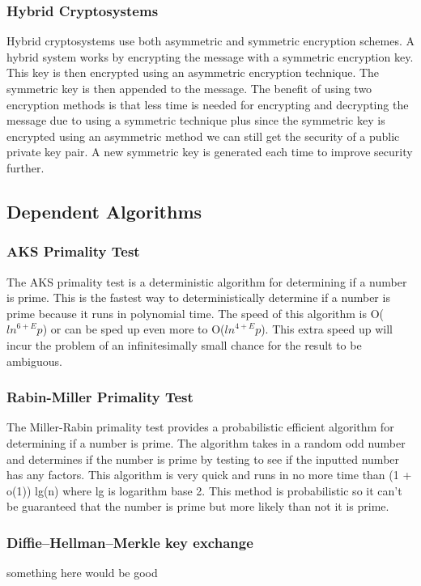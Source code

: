 \documentclass[conference]{IEEEtran}
\begin{document}
\subsubsection{Hybrid Cryptosystems}
Hybrid cryptosystems use both asymmetric and symmetric encryption schemes. A hybrid system works by encrypting the message with a symmetric encryption key. This key is then encrypted using an asymmetric encryption technique. The symmetric key is then appended to the message. The benefit of using two encryption methods is that less time is needed for encrypting and decrypting the message due to using a symmetric technique plus since the symmetric key is encrypted using an asymmetric method we can still get the security of a public private key pair. A new symmetric key is generated each time to improve security further. 


\subsection{Dependent Algorithms}

\subsubsection{AKS Primality Test}
The AKS primality test is a deterministic algorithm for determining if a number is prime. This is the fastest way to deterministically determine if a number is prime because it runs in polynomial time. The speed of this algorithm is O(${ln}^{6 + E} p$) or can be sped up even more to O(${ln}^{4 + E} p$). This extra speed up will incur the problem of an infinitesimally small chance for the result to be ambiguous.

\subsubsection{Rabin-Miller Primality Test}
The Miller-Rabin primality test provides a probabilistic efficient algorithm for determining if a number is prime. The algorithm takes in a random odd number and determines if the number is prime by testing to see if the inputted number has any factors. This algorithm is very quick and runs in no more time than (1 + o(1)) lg(n) where lg is logarithm base 2. This method is probabilistic so it can't be guaranteed that the number is prime but more likely than not it is prime.

\color{red}
\subsubsection{Diffie–Hellman–Merkle key exchange}
something here would be good
\end{document}
